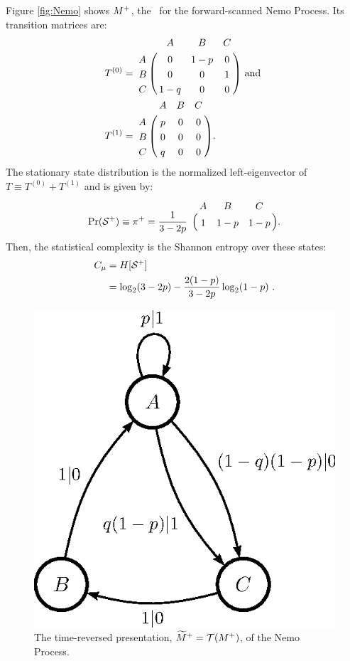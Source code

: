 \documentclass[prl,twocolumn,showpacs,superscriptaddress,preprintnumbers,floatfix]{revtex4}
\theoremstyle{plain}   \newtheorem{Lem}{Lemma}
\theoremstyle{plain} 	\newtheorem{Cor}{Corollary}
\theoremstyle{plain} 	\newtheorem{The}{Theorem}
\theoremstyle{plain} 	\newtheorem{Prop}{Proposition}
\theoremstyle{plain} 	\newtheorem*{Conj}{Conjecture}
\theoremstyle{plain}	\newtheorem*{Rem}{Remark}
\theoremstyle{plain}	\newtheorem*{Def}{Definition}
\theoremstyle{plain}	\newtheorem*{Not}{Notation}
\begin{document}
Figure \ref{fig:Nemo} shows ${M}^{+}$, the \eM\ for the forward-scanned
Nemo Process. Its transition matrices are:
\begin{align*}
T^{(0)} &= 
\bordermatrix{%
  & A & B & C \cr
A & 0 & 1-p & 0 \cr
B & 0 & 0 & 1 \cr
C & 1-q & 0 & 0
} \textrm{ and }\\
T^{(1)} &=
\bordermatrix{%
  & A & B & C \cr
A & p & 0 & 0 \cr
B & 0 & 0 & 0 \cr
C & q & 0 & 0
}.
\end{align*}
The stationary state distribution is the normalized left-eigenvector of 
$T \equiv T^{(0)} + T^{(1)}$ and is given by:
\begin{align*}
\Pr(\FutureCausalState) \equiv \pi^+ = \frac{1}{3-2p}
\bordermatrix{%
 & A & B & C \cr
 & 1 & 1-p & 1-p
}.
\end{align*}
Then, the statistical complexity is the Shannon entropy over these states:
\begin{align*}
C_\mu &= H[{\mathcal{S}}^{+}]  \\
           & = \log_2(3-2p) - \frac{2(1-p)}{3-2p} \log_2 (1-p) ~.
\end{align*}

\begin{figure}[th]
\begin{center}
\includegraphics{nemo_TRfeM_gr.eps}
\caption{The time-reversed presentation, $\widetilde{M}^+ = \mathcal{T}({M}^{+})$,
  of the Nemo Process.
  }
\label{fig:TRNemo}
\end{center}
\end{figure}
\end{document}
